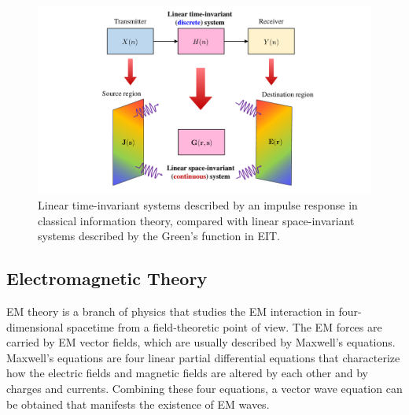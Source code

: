 \documentclass[journal,twocolumn]{IEEEtran}
\begin{document}
\begin{figure}
	\centering 
	\includegraphics[width=0.9\linewidth]{figures/LTI-LSI-new.pdf} 
	\caption{Linear time-invariant systems described by an impulse response in classical information theory, compared with linear space-invariant systems described by the Green's function in EIT.} 
	\label{fig:Shannon_Marzetta}
\end{figure}

\vspace{-1em}
\subsection{Electromagnetic Theory}
\label{Sec_2_Subsec_3}
EM theory is a branch of physics that studies the EM interaction in four-dimensional spacetime from a field-theoretic point of view. The EM forces are carried by EM vector fields, which are usually described by Maxwell's equations. Maxwell's equations are four linear partial differential equations that characterize how the electric fields and magnetic fields are altered by each other and by charges and currents. Combining these four equations, a vector wave equation can be obtained that manifests the existence of EM waves. 
\end{document}
